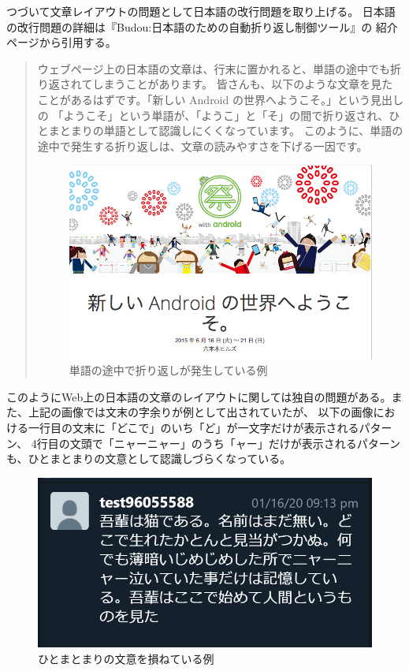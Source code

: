 つづいて文章レイアウトの問題として日本語の改行問題を取り上げる。
日本語の改行問題の詳細は『Budou:日本語のための自動折り返し制御ツール』\footnotemark[4]の
紹介ページから引用する。
\begin{quotation}
    ウェブページ上の日本語の文章は、行末に置かれると、単語の途中でも折り返されてしまうことがあります。
    皆さんも、以下のような文章を見たことがあるはずです。「新しい Android の世界へようこそ。」という見出しの
    「ようこそ」という単語が、「ようこ」と「そ」の間で折り返され、ひとまとまりの単語として認識しにくくなっています。
    このように、単語の途中で発生する折り返しは、文章の読みやすさを下げる一因です。
    \begin{figure}[H]
        \centering
        \label{fig:image4}
        \includegraphics[width=0.7\columnwidth]{image/01/img2.png}
        \caption[単語の途中で折り返しが発生している例] {単語の途中で折り返しが発生している例}
    \end{figure}
\end{quotation}

このようにWeb上の日本語の文章のレイアウトに関しては独自の問題がある。また、上記の画像では文末の字余りが例として出されていたが、
以下の画像における一行目の文末に「どこで」のいち「ど」が一文字だけが表示されるパターン、
4行目の文頭で「ニャーニャー」のうち「ャー」だけが表示されるパターンも、ひとまとまりの文意として認識しづらくなっている。
    \begin{figure}[H]
        \centering
        \label{fig:image5}
        \includegraphics[width=0.7\columnwidth]{image/01/img5.png}
        \caption[ひとまとまりの文意を損ねている例] {ひとまとまりの文意を損ねている例}
    \end{figure}

